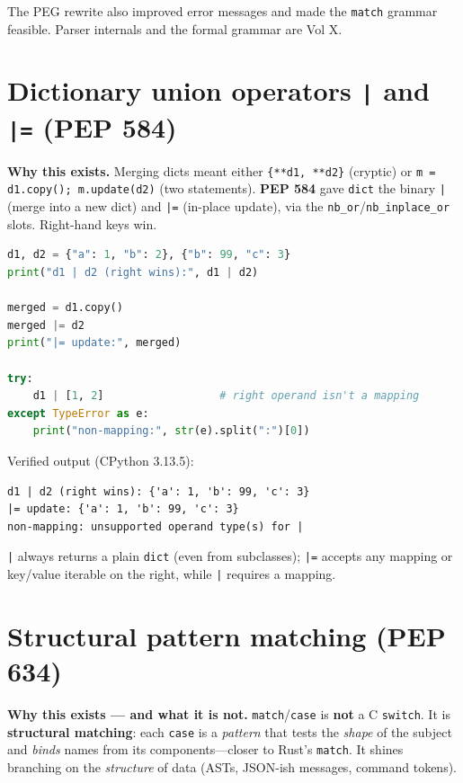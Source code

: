 The PEG rewrite also improved error messages and made the \texttt{match} grammar feasible. Parser
internals and the formal grammar are Vol X.

\section{Dictionary union operators \texttt{|} and \texttt{|=} (PEP 584)}

\textbf{Why this exists.} Merging dicts meant either \texttt{\{**d1, **d2\}} (cryptic) or
\texttt{m = d1.copy(); m.update(d2)} (two statements). \textbf{PEP 584} gave \texttt{dict} the binary
\texttt{|} (merge into a new dict) and \texttt{|=} (in-place update), via the
\texttt{nb\_or}/\texttt{nb\_inplace\_or} slots. Right-hand keys win.

\begin{lstlisting}[language=Python, caption={| merges (right wins), |= updates in place; non-mappings raise.}]
d1, d2 = {"a": 1, "b": 2}, {"b": 99, "c": 3}
print("d1 | d2 (right wins):", d1 | d2)

merged = d1.copy()
merged |= d2
print("|= update:", merged)

try:
    d1 | [1, 2]                  # right operand isn't a mapping
except TypeError as e:
    print("non-mapping:", str(e).split(":")[0])
\end{lstlisting}

Verified output (CPython 3.13.5):

\begin{lstlisting}[caption={Output}]
d1 | d2 (right wins): {'a': 1, 'b': 99, 'c': 3}
|= update: {'a': 1, 'b': 99, 'c': 3}
non-mapping: unsupported operand type(s) for |
\end{lstlisting}

\texttt{|} always returns a plain \texttt{dict} (even from subclasses); \texttt{|=} accepts any
mapping or key/value iterable on the right, while \texttt{|} requires a mapping.

\section{Structural pattern matching (PEP 634)}

\textbf{Why this exists --- and what it is not.} \texttt{match}/\texttt{case} is \textbf{not} a C
\texttt{switch}. It is \textbf{structural matching}: each \texttt{case} is a \emph{pattern} that
tests the \emph{shape} of the subject and \emph{binds} names from its components---closer to Rust's
\texttt{match}. It shines branching on the \emph{structure} of data (ASTs, JSON-ish messages,
command tokens).

